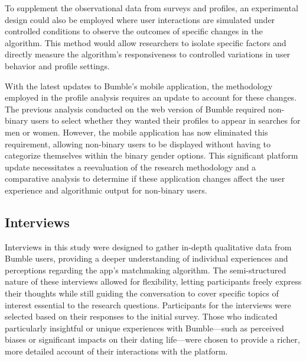 To supplement the observational data from surveys and profiles, an experimental design could also be employed where user interactions are simulated under controlled conditions to observe the outcomes of specific changes in the algorithm. This method would allow researchers to isolate specific factors and directly measure the algorithm’s responsiveness to controlled variations in user behavior and profile settings.

With the latest updates to Bumble's mobile application, the methodology employed in the profile analysis requires an update to account for these changes. The previous analysis conducted on the web version of Bumble required non-binary users to select whether they wanted their profiles to appear in searches for men or women. However, the mobile application has now eliminated this requirement, allowing non-binary users to be displayed without having to categorize themselves within the binary gender options. This significant platform update necessitates a reevaluation of the research methodology and a comparative analysis to determine if these application changes affect the user experience and algorithmic output for non-binary users.

\subsection{Interviews}
Interviews in this study were designed to gather in-depth qualitative data from Bumble users, providing a deeper understanding of individual experiences and perceptions regarding the app's matchmaking algorithm. The semi-structured nature of these interviews allowed for flexibility, letting participants freely express their thoughts while still guiding the conversation to cover specific topics of interest essential to the research questions. Participants for the interviews were selected based on their responses to the initial survey. Those who indicated particularly insightful or unique experiences with Bumble—such as perceived biases or significant impacts on their dating life—were chosen to provide a richer, more detailed account of their interactions with the platform.


